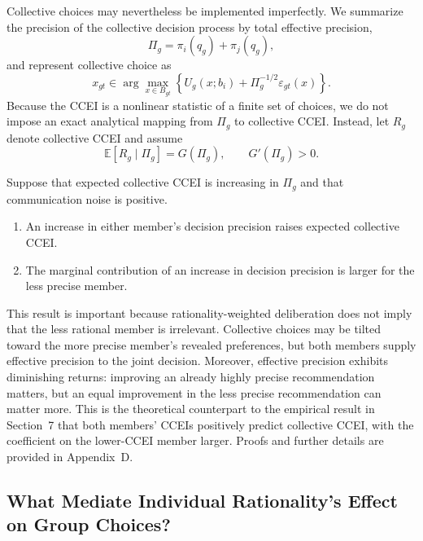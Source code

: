 \documentclass[11 pt]{article}
\begin{document}
Collective choices may nevertheless be implemented imperfectly. We summarize the precision of the collective decision process by total effective precision,
\begin{equation}
    \Pi_g=\pi_i(q_g)+\pi_j(q_g),
    \label{eq:collective_precision_appendix}
\end{equation}
and represent collective choice as
\begin{equation}
    x_{gt}\in\arg\max_{x\in B_{gt}}\left\{U_g(x;b_i)+\Pi_g^{-1/2}\varepsilon_{gt}(x)\right\}.
    \label{eq:collective_random_utility}
\end{equation}
Because the CCEI is a nonlinear statistic of a finite set of choices, we do not impose an exact analytical mapping from $\Pi_g$ to collective CCEI. Instead, let $R_g$ denote collective CCEI and assume
\begin{equation}
    \mathbb{E}[R_g\mid\Pi_g]=G(\Pi_g), \qquad G'(\Pi_g)>0.
    \label{eq:collective_ccei_mapping}
\end{equation}

\begin{proposition}
\label{prop:collective_precision}
Suppose that expected collective CCEI is increasing in $\Pi_g$ and that communication noise is positive.
\begin{enumerate}
    \item An increase in either member's decision precision raises expected collective CCEI.
    \item The marginal contribution of an increase in decision precision is larger for the less precise member.
\end{enumerate}
\end{proposition}

This result is important because rationality-weighted deliberation does not imply that the less rational member is irrelevant. Collective choices may be tilted toward the more precise member's revealed preferences, but both members supply effective precision to the joint decision. Moreover, effective precision exhibits diminishing returns: improving an already highly precise recommendation matters, but an equal improvement in the less precise recommendation can matter more. This is the theoretical counterpart to the empirical result in Section~7 that both members' CCEIs positively predict collective CCEI, with the coefficient on the lower-CCEI member larger. Proofs and further details are provided in Appendix~D.


\subsection{What Mediate Individual Rationality's Effect on Group Choices?}
\label{sec:heterogeneity}
\end{document}
